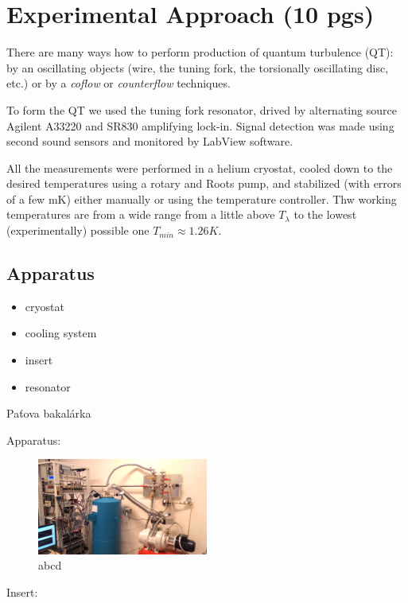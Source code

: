\chapter{Experimental Approach (10 pgs)}

There are many ways how to perform production of quantum turbulence (QT): by an oscillating objects (wire, the tuning fork, the torsionally oscillating disc, etc.) or by a \textit{coflow} or \textit{counterflow} techniques.

To form the QT we used the tuning fork resonator, drived by alternating source Agilent A33220 and SR830 amplifying lock-in. Signal detection was made using second sound sensors and monitored by LabView software.

All the measurements were performed in a helium cryostat, cooled down to the desired temperatures using a rotary and Roots pump, and stabilized (with errors of a few mK) either manually or using the temperature controller. Thw working temperatures are from a wide range from a little above $T_{\lambda}$ to the lowest (experimentally) possible one $T_{min} \approx 1.26\unit{K}$.

\section{Apparatus}
\begin{itemize}
	\item cryostat
	\item cooling system
	\item insert
	\item resonator
\end{itemize}

Paťova bakalárka

Apparatus:

\begin{figure}[h]
	\centering
	\includegraphics[width=0.5\textwidth]{graphics/exp/apparatus}
	\caption{abcd}
\end{figure}

Insert:

